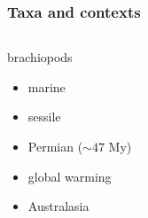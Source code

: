 \documentclass{beamer}
\begin{document}
\begin{frame}
  \frametitle{Taxa and contexts}

  \begin{columns}
    \begin{column}{0.5\textwidth}
      \begin{block}{brachiopods}
        \begin{itemize}
          \item marine
          \item sessile
          \item Permian (\(\sim 47\) My)
          \item global warming
          \item Australasia
        \end{itemize}
      \end{block}


\end{column}
\end{columns}
\end{frame}
\end{document}
